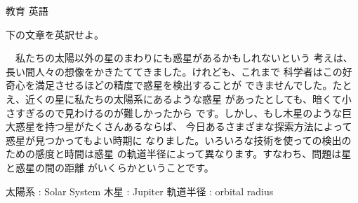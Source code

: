 \documentclass[fleqn]{jbook}
\begin{document}
\begin{question}{教育 英語}{}
\begin{subquestions}
\SubQuestion
  下の文章を英訳せよ。

  　私たちの太陽以外の星のまわりにも惑星があるかもしれないという
  考えは、長い間人々の想像をかきたててきました。けれども、これまで
  科学者はこの好奇心を満足させるほどの精度で惑星を検出することが
  できませんでした。たとえ、近くの星に私たちの太陽系にあるような惑星
  があったとしても、暗くて小さすぎるので見わけるのが難しかったから
  です。しかし、もし木星のような巨大惑星を持つ星がたくさんあるならば、
  今日あるさまざまな探索方法によって惑星が見つかってもよい時期に
  なりました。いろいろな技術を使っての検出のための感度と時間は惑星
  の軌道半径によって異なります。すなわち、問題は星と惑星の間の距離
  がいくらかということです。

  太陽系   : Solar System \quad
  木星     : Jupiter \quad
  軌道半径 : orbital radius

  \end{subquestions}
\end{question}
\end{document}
